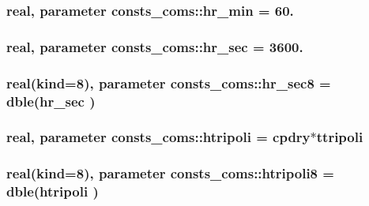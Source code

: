 \subsubsection[{\texorpdfstring{hr\+\_\+min}{hr_min}}]{\setlength{\rightskip}{0pt plus 5cm}real, parameter consts\+\_\+coms\+::hr\+\_\+min = 60.}\hypertarget{namespaceconsts__coms_a1ade40f36e0ba6beb80054d5963b2b23}{}\label{namespaceconsts__coms_a1ade40f36e0ba6beb80054d5963b2b23}
\subsubsection[{\texorpdfstring{hr\+\_\+sec}{hr_sec}}]{\setlength{\rightskip}{0pt plus 5cm}real, parameter consts\+\_\+coms\+::hr\+\_\+sec = 3600.}\hypertarget{namespaceconsts__coms_acae5e7f232dc6e70cfdeaf44d9263406}{}\label{namespaceconsts__coms_acae5e7f232dc6e70cfdeaf44d9263406}
\subsubsection[{\texorpdfstring{hr\+\_\+sec8}{hr_sec8}}]{\setlength{\rightskip}{0pt plus 5cm}real(kind=8), parameter consts\+\_\+coms\+::hr\+\_\+sec8 = dble({\bf hr\+\_\+sec} )}\hypertarget{namespaceconsts__coms_ab0f214f79265c82988672d0e10e674cb}{}\label{namespaceconsts__coms_ab0f214f79265c82988672d0e10e674cb}
\subsubsection[{\texorpdfstring{htripoli}{htripoli}}]{\setlength{\rightskip}{0pt plus 5cm}real, parameter consts\+\_\+coms\+::htripoli = {\bf cpdry}$\ast${\bf ttripoli}}\hypertarget{namespaceconsts__coms_a823cf4f0ac3ad6922988b3dd8cb809d2}{}\label{namespaceconsts__coms_a823cf4f0ac3ad6922988b3dd8cb809d2}
\subsubsection[{\texorpdfstring{htripoli8}{htripoli8}}]{\setlength{\rightskip}{0pt plus 5cm}real(kind=8), parameter consts\+\_\+coms\+::htripoli8 = dble({\bf htripoli} )}\hypertarget{namespaceconsts__coms_a75f7026b5529f3647a8f5787e0092c85}{}\label{namespaceconsts__coms_a75f7026b5529f3647a8f5787e0092c85}
